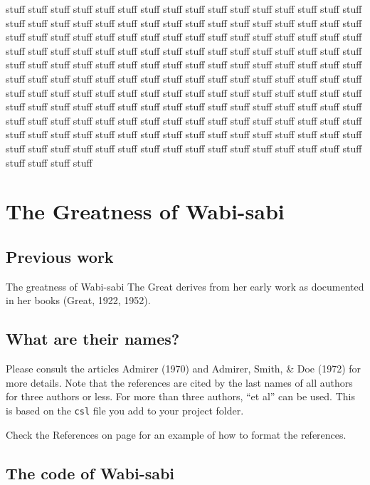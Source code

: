 \documentclass[
  dissertation]{bsu-cs}
\begin{document}
stuff stuff stuff stuff stuff stuff stuff stuff stuff stuff stuff stuff
stuff stuff stuff stuff stuff stuff stuff stuff stuff stuff stuff stuff
stuff stuff stuff stuff stuff stuff stuff stuff stuff stuff stuff stuff
stuff stuff stuff stuff stuff stuff stuff stuff stuff stuff stuff stuff
stuff stuff stuff stuff stuff stuff stuff stuff stuff stuff stuff stuff
stuff stuff stuff stuff stuff stuff stuff stuff stuff stuff stuff stuff
stuff stuff stuff stuff stuff stuff stuff stuff stuff stuff stuff stuff
stuff stuff stuff stuff stuff stuff stuff stuff stuff stuff stuff stuff
stuff stuff stuff stuff stuff stuff stuff stuff stuff stuff stuff stuff
stuff stuff stuff stuff stuff stuff stuff stuff stuff stuff stuff stuff
stuff stuff stuff stuff stuff stuff stuff stuff stuff stuff stuff stuff
stuff stuff stuff stuff stuff stuff stuff stuff stuff stuff stuff stuff
stuff stuff stuff stuff stuff stuff stuff stuff stuff stuff stuff stuff
stuff stuff stuff stuff stuff stuff stuff stuff stuff stuff stuff stuff
stuff stuff stuff stuff stuff stuff stuff stuff stuff stuff stuff stuff

\chapter{The Greatness of Wabi-sabi} \label{ch-wabisabiGreatness}

\section{Previous work}\label{previous-work}

The greatness of Wabi-sabi The Great derives from her early work as
documented in her books (Great, 1922, 1952).

\section{What are their names?}\label{what-are-their-names}

Please consult the articles Admirer (1970) and Admirer, Smith, \& Doe
(1972) for more details. Note that the references are cited by the last
names of all authors for three authors or less. For more than three
authors, ``et al'' can be used. This is based on the \texttt{csl} file
you add to your project folder.

Check the References on page \pageref{refs} for an example of how to
format the references.

\section{The code of Wabi-sabi}\label{the-code-of-wabi-sabi}
\end{document}
